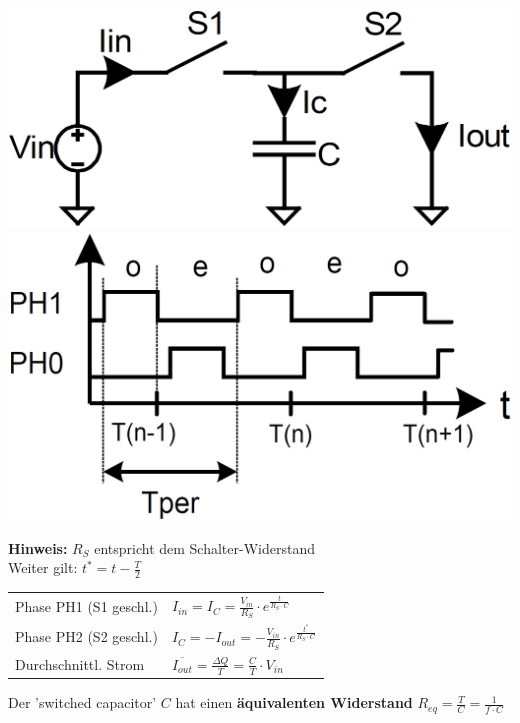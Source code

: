 \begin{minipage}[c]{0.28\columnwidth}
    \includegraphics[width=\columnwidth]{images/grundprinzip_switched_capacitor_schaltung.png}
    \vspace{0.2cm}
    \includegraphics[width=\columnwidth]{images/grundprinzip_switched_capacitor_timing.png}
\end{minipage}
\hfill
\begin{minipage}[c]{0.7\columnwidth}
    \textbf{Hinweis:} $R_S$ entspricht dem Schalter-Widerstand \\
    Weiter gilt: $t^* = t - \frac{T}{2}$

    \begin{tabular}{ll@{}} 
        Phase PH1 (S1 geschl.)  & $I_{in} = I_C = \frac{V_{in}}{R_S} \cdot e^{\frac{t}{R_S \cdot C}} $ \\
        Phase PH2 (S2 geschl.)  & $I_C = - I_{out} = - \frac{V_{in}}{R_S} \cdot e^{\frac{t^*}{R_S \cdot C}}$ \\
        Durchschnittl. Strom    & $\overline{I_{out}} = \frac{\Delta Q}{T} =\frac{C}{T} \cdot V_{in}$ \\
    \end{tabular}

    Der 'switched capacitor' $C$ hat einen \textbf{äquivalenten Widerstand} $R_{eq} = \frac{T}{C} = \frac{1}{f \cdot C}$
\end{minipage}


